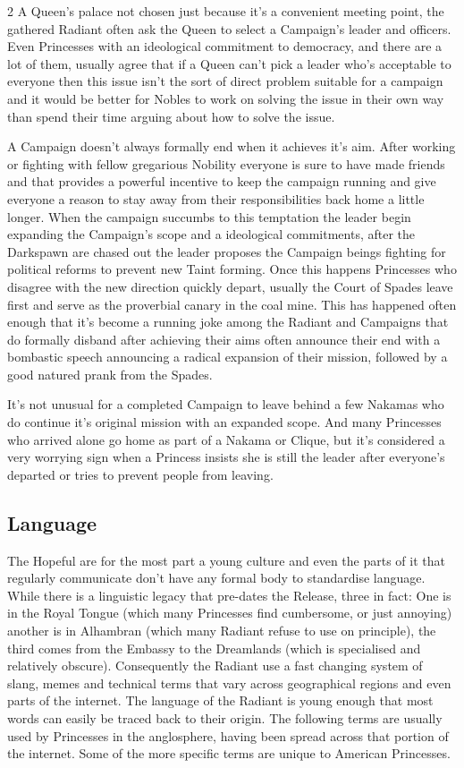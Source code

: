\begin{multicols}{2}
A Queen's palace not chosen just because it's a convenient meeting point, the gathered Radiant often ask the Queen to select a Campaign's leader and officers. Even Princesses with an ideological commitment to democracy, and there are a lot of them, usually agree that if a Queen can't pick a leader who's acceptable to everyone then this issue isn't the sort of direct problem suitable for a campaign and it would be better for Nobles to work on solving the issue in their own way than spend their time arguing about how to solve the issue. 

A Campaign doesn't always formally end when it achieves it's aim. After working or fighting with fellow gregarious Nobility everyone is sure to have made friends and that provides a powerful incentive to keep the campaign running and give everyone a reason to stay away from their responsibilities back home a little longer. When the campaign succumbs to this temptation the leader begin expanding the Campaign's scope and a ideological commitments, after the Darkspawn are chased out the leader proposes the Campaign beings fighting for political reforms to prevent new Taint forming. Once this happens Princesses who disagree with the new direction quickly depart, usually the Court of Spades leave first and serve as the proverbial canary in the coal mine. This has happened often enough that it's become a running joke among the Radiant and Campaigns that do formally disband after achieving their aims often announce their end with a bombastic speech announcing a radical expansion of their mission, followed by a good natured prank from the Spades. 

It's not unusual for a completed Campaign to leave behind a few Nakamas who do continue it's original mission with an expanded scope. And many Princesses who arrived alone go home as part of a Nakama or Clique, but it's considered a very worrying sign when a Princess insists she is still the leader after everyone's departed or tries to prevent people from leaving.

\subsection*{Language}

The Hopeful are for the most part a young culture and even the parts of it that regularly communicate don't have any formal body to standardise language. While there is a linguistic legacy that pre-dates the Release, three in fact: One is in the Royal Tongue (which many Princesses find cumbersome, or just annoying) another is in Alhambran (which many Radiant refuse to use on principle), the third comes from the Embassy to the Dreamlands (which is specialised and relatively obscure). Consequently the Radiant use a fast changing system of slang, memes and technical terms that vary across geographical regions and even parts of the internet. The language of the Radiant is young enough that most words can easily be traced back to their origin. The following terms are usually used by Princesses in the anglosphere, having been spread across that portion of the internet. Some of the more specific terms are unique to American Princesses. 


\end{multicols}
